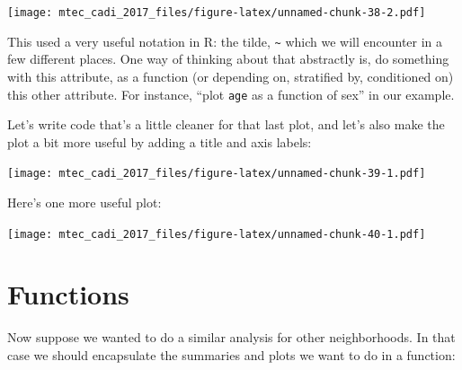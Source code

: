 \documentclass[12pt,]{book}
\newenvironment{Shaded}{\begin{snugshade}}{\end{snugshade}}
\newcommand{\KeywordTok}[1]{\textcolor[rgb]{0.13,0.29,0.53}{\textbf{#1}}}
\newcommand{\DataTypeTok}[1]{\textcolor[rgb]{0.13,0.29,0.53}{#1}}
\newcommand{\StringTok}[1]{\textcolor[rgb]{0.31,0.60,0.02}{#1}}
\newcommand{\OperatorTok}[1]{\textcolor[rgb]{0.81,0.36,0.00}{\textbf{#1}}}
\newcommand{\NormalTok}[1]{#1}
\theoremstyle{definition}
\theoremstyle{definition}
\theoremstyle{definition}
\theoremstyle{remark}
\begin{document}
\texttt{[image: mtec\_cadi\_2017\_files/figure-latex/unnamed-chunk-38-2.pdf]}

This used a very useful notation in R: the tilde,
\texttt{\textasciitilde{}} which we will encounter in a few different
places. One way of thinking about that abstractly is, do something with
this attribute, as a function (or depending on, stratified by,
conditioned on) this other attribute. For instance, ``plot \texttt{age}
as a function of sex'' in our example.

Let's write code that's a little cleaner for that last plot, and let's
also make the plot a bit more useful by adding a title and axis labels:

\begin{Shaded}
\end{Shaded}

\texttt{[image: mtec\_cadi\_2017\_files/figure-latex/unnamed-chunk-39-1.pdf]}

Here's one more useful plot:

\begin{Shaded}
\end{Shaded}

\texttt{[image: mtec\_cadi\_2017\_files/figure-latex/unnamed-chunk-40-1.pdf]}

\section{Functions}\label{functions}

Now suppose we wanted to do a similar analysis for other neighborhoods.
In that case we should encapsulate the summaries and plots we want to do
in a function:
\end{document}
